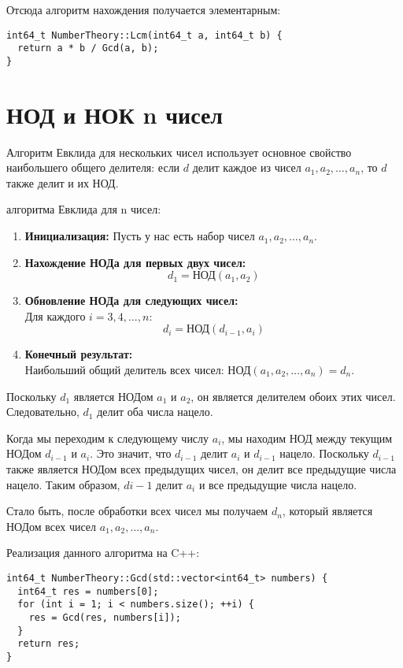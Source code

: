 \documentclass[12pt, a4paper, openany]{book}
\begin{document}
\newpage
\noindent
Отсюда алгоритм нахождения получается элементарным:
\begin{lstlisting}
int64_t NumberTheory::Lcm(int64_t a, int64_t b) {
  return a * b / Gcd(a, b);
}
\end{lstlisting}

\section{НОД и НОК n чисел}

Алгоритм Евклида для нескольких чисел использует основное свойство наибольшего общего делителя: если $d$ делит каждое из чисел $a_1, a_2, …, a_n$, то $d$ также делит и их НОД.

\vspace{12pt} алгоритма Евклида для n чисел:

\begin{enumerate}
    \item \textbf{Инициализация:} Пусть у нас есть набор чисел \(a_1, a_2, \ldots, a_n\).
    \item \textbf{Нахождение НОДа для первых двух чисел:}
    \[ d_1 = \text{НОД}(a_1, a_2) \]
    \item \textbf{Обновление НОДа для следующих чисел:} \\
    Для каждого \(i = 3, 4, \ldots, n\):
    \[ d_i = \text{НОД}(d_{i-1}, a_i) \]
    \item \textbf{Конечный результат:} \\
    Наибольший общий делитель всех чисел: НОД\((a_1, a_2, \ldots, a_n) = d_n\).
\end{enumerate}

Поскольку $d_1$ является НОДом $a_1$ и $a_2$, он является делителем обоих этих чисел. Следовательно, $d_1$ делит оба числа нацело.

Когда мы переходим к следующему числу $a_i$, мы находим НОД между текущим НОДом $d_{i-1}$ и $a_i$. Это значит, что $d_{i-1}$ делит $a_i$ и $d_{i-1}$ нацело. Поскольку $d_{i-1}$ также является НОДом всех предыдущих чисел, он делит все предыдущие числа нацело. Таким образом, $d{i-1}$ делит $a_i$ и все предыдущие числа нацело.

Стало быть, после обработки всех чисел мы получаем $d_n$, который является НОДом всех чисел $a_1, a_2, …,a_n$.

\newpage
\noindent
Реализация данного алгоритма на C++:

\begin{lstlisting}
int64_t NumberTheory::Gcd(std::vector<int64_t> numbers) {
  int64_t res = numbers[0];
  for (int i = 1; i < numbers.size(); ++i) {
    res = Gcd(res, numbers[i]);
  }
  return res;
}
\end{lstlisting}
\end{document}
